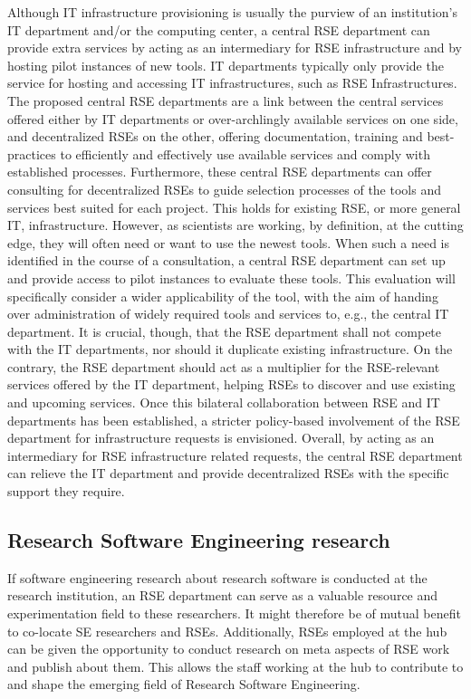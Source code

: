 \documentclass{article}
\begin{document}
Although IT infrastructure provisioning is usually the purview of an institution's IT department and/or the computing center,
a central RSE department can provide extra services by acting as an intermediary for RSE infrastructure and by hosting pilot instances of new tools.
IT departments typically only provide the service for hosting and accessing IT infrastructures, such as RSE Infrastructures.
The proposed central RSE departments are a link between the central services offered either by IT departments or over-archlingly available services on one side,
and decentralized RSEs on the other, offering documentation, training and best-practices to efficiently and effectively use available services and comply with established processes.
Furthermore, these central RSE departments can offer consulting for decentralized RSEs to guide selection processes of the tools and services best suited for each project.
This holds for existing RSE, or more general IT, infrastructure.
However, as scientists are working, by definition, at the cutting edge, they will often need or want to use the newest tools.
When such a need is identified in the course of a consultation, a central RSE department can set up and provide access to pilot instances to evaluate these tools.
This evaluation will specifically consider a wider applicability of the tool, with the aim of handing over administration of widely required tools and services to, e.g., the central IT department.
It is crucial, though, that the RSE department shall not compete with the IT departments, nor should it duplicate existing infrastructure.
On the contrary, the RSE department should act as a multiplier for the RSE-relevant services offered by the IT department, helping RSEs to discover and use existing and upcoming services.
Once this bilateral collaboration between RSE and IT departments has been established, a stricter policy-based involvement of the RSE department for infrastructure requests is envisioned.
Overall, by acting as an intermediary for RSE infrastructure related requests, the central RSE department can relieve the IT department and provide decentralized RSEs with the specific support they require.

\subsection{Research Software Engineering research}

If software engineering research about research software is conducted at the research institution, an RSE department can serve as a valuable resource and experimentation field to these researchers.
It might therefore be of mutual benefit to co-locate SE researchers and RSEs.
Additionally, RSEs employed at the hub can be given the opportunity to conduct research on meta aspects of RSE work and publish about them.
This allows the staff working at the hub to contribute to and shape the emerging field of Research Software Engineering.
\end{document}
